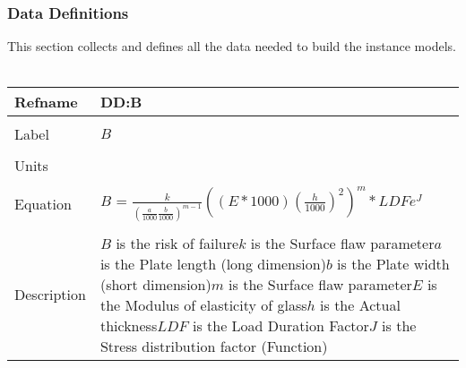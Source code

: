 \documentclass[12pt]{article}
\begin{document}
\subsubsection{Data Definitions}
\label{Sec:DDs}
This section collects and defines all the data needed to build the instance models.
~\newline
\noindent \begin{minipage}{\textwidth}
\begin{tabular}{p{} p{}}
\toprule \textbf{Refname} & \textbf{DD:B}
\label{DD:B}
\\ \midrule \\
Label & $B$
\\ \midrule \\
Units & 
\\ \midrule \\
Equation & $B$ = $\frac{k}{(\frac{a}{1000}\frac{b}{1000})^{m-1}}((E*1000)(\frac{h}{1000})^{2})^{m}*LDFe^{J}$
\\ \midrule \\
Description & $B$ is the risk of failure\newline$k$ is the Surface flaw parameter\newline$a$ is the Plate length (long dimension)\newline$b$ is the Plate width (short dimension)\newline$m$ is the Surface flaw parameter\newline$E$ is the Modulus of elasticity of glass\newline$h$ is the Actual thickness\newline$LDF$ is the Load Duration Factor\newline$J$ is the Stress distribution factor (Function)
\\ \bottomrule \end{tabular}
\end{minipage}\\
~\newline
\end{document}
